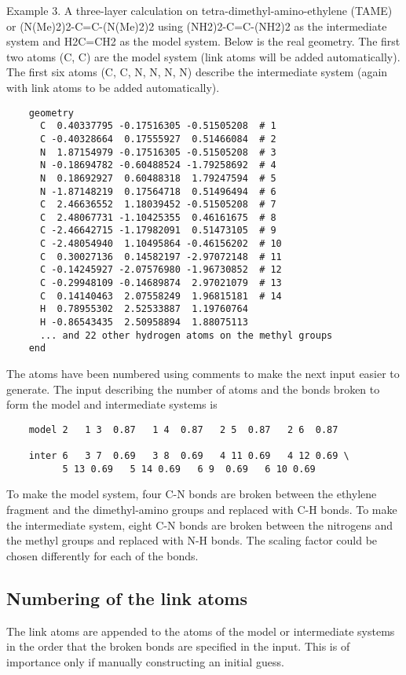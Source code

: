 Example 3.  A three-layer calculation on tetra-dimethyl-amino-ethylene
(TAME) or (N(Me)2)2-C=C-(N(Me)2)2 using (NH2)2-C=C-(NH2)2 as the
intermediate system and H2C=CH2 as the model system.  Below is the
real geometry.  The first two atoms (C, C) are the model system (link
atoms will be added automatically).  The first six atoms (C, C, N, N,
N, N) describe the intermediate system (again with link atoms to be
added automatically).
\begin{verbatim}
    geometry 
      C  0.40337795 -0.17516305 -0.51505208  # 1
      C -0.40328664  0.17555927  0.51466084  # 2
      N  1.87154979 -0.17516305 -0.51505208  # 3
      N -0.18694782 -0.60488524 -1.79258692  # 4
      N  0.18692927  0.60488318  1.79247594  # 5
      N -1.87148219  0.17564718  0.51496494  # 6
      C  2.46636552  1.18039452 -0.51505208  # 7
      C  2.48067731 -1.10425355  0.46161675  # 8
      C -2.46642715 -1.17982091  0.51473105  # 9
      C -2.48054940  1.10495864 -0.46156202  # 10
      C  0.30027136  0.14582197 -2.97072148  # 11
      C -0.14245927 -2.07576980 -1.96730852  # 12
      C -0.29948109 -0.14689874  2.97021079  # 13
      C  0.14140463  2.07558249  1.96815181  # 14
      H  0.78955302  2.52533887  1.19760764
      H -0.86543435  2.50958894  1.88075113
      ... and 22 other hydrogen atoms on the methyl groups
    end
\end{verbatim}
The atoms have been numbered using comments to make the next input
easier to generate.  The input describing the number of atoms and the
bonds broken to form the model and intermediate systems is
\begin{verbatim}
    model 2   1 3  0.87   1 4  0.87   2 5  0.87   2 6  0.87

    inter 6   3 7  0.69   3 8  0.69   4 11 0.69   4 12 0.69 \
	      5 13 0.69   5 14 0.69   6 9  0.69   6 10 0.69
\end{verbatim}
To make the model system, four C-N bonds are broken between the
ethylene fragment and the dimethyl-amino groups and replaced with C-H
bonds.  To make the intermediate system, eight C-N bonds are broken
between the nitrogens and the methyl groups and replaced with N-H
bonds.  The scaling factor could be chosen differently for each of the
bonds.

\subsection{Numbering of the link atoms}

The link atoms are appended to the atoms of the model or intermediate
systems in the order that the broken bonds are specified in the input.
This is of importance only if manually constructing an initial guess.

